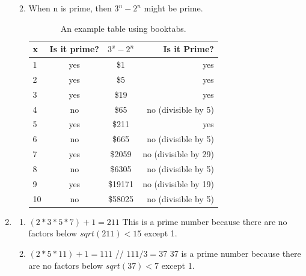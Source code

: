 \documentclass[12pt]{exam}
\begin{document}
\begin{enumerate}
\begin{enumerate}
\begin{table}[h]
\begin{tabular}{lccr}
        \bottomrule
    \end{tabular}
\end{table}



    \item When n is prime, then $3^n - 2^n$ might be prime.

    \begin{table}[h]
    \centering %
    \caption{An example table using booktabs.}
    \label{tab:example_table}
    
    \begin{tabular}{lccr} %
        \toprule
        \textbf{x} & \textbf{Is it prime?} & \textbf{$3^x - 2^n$} & \textbf{Is it Prime?}\\
        \midrule
        1            & yes               & \$1        & yes                  \\
        2            & yes               & \$5        & yes                  \\
        3            & yes               & \$19       & yes                  \\
        4            & no                & \$65       & no (divisible by 5)  \\
        5            & yes               & \$211      & yes                  \\
        6            & no                & \$665      & no (divisible by 5)  \\
        7            & yes               & \$2059     & no (divisible by 29) \\
        8            & no                & \$6305     & no (divisible by 5)  \\
        9            & yes               & \$19171    & no (divisible by 19) \\
        10           & no                & \$58025    & no (divisible by 5)  \\

        \bottomrule
    \end{tabular}
\end{table}
\end{enumerate}


\item \begin{enumerate}
    \item $(2*3*5*7) + 1 = 211$
    This is a prime number because there are no factors below $sqrt(211) < 15$ except 1.
    \item $(2*5*11) + 1 = 111$ // $111 / 3 = 37$
    37 is a prime number because there are no factors below $sqrt(37) < 7$ except 1.
\end{enumerate}


\end{enumerate}
\end{document}
